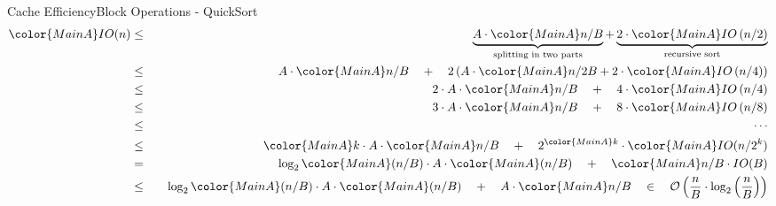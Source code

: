 
\begin{frame}{Cache Efficiency}{Block Operations - QuickSort}
  \begin{eqnarray*}
    {\color{MainA}IO(n)} &\leq\hspace{1em}&
      \underbrace{
        A \cdot {\color{MainA}n/B}
      }_{\text{splitting in two parts}}
      +
      \underbrace{
        2 \cdot {\color{MainA}IO\left(n/2 \right)}
      }_{\text{recursive sort}}\\
    {} &\leq&
      A \cdot {\color{MainA} n/B} \hspace{1em}+ \hspace{1em}2 \left(
        A \cdot {\color{MainA} n/2B}
        + 2 \cdot {\color{MainA}IO\left(n/4\right)}
      \right)\\
    {} &\leq&
      2 \cdot A \cdot {\color{MainA}n/B}
      \hspace{1em}+ \hspace{1em}4 \cdot {\color{MainA}IO\left(n/4\right)}\\
    {} &\leq&
      3 \cdot A \cdot {\color{MainA}n/B}
      \hspace{1em}+ \hspace{1em}8 \cdot {\color{MainA}IO\left(n/8\right)}\\
    {} &\leq&\hspace{1.5em}\cdots\\
    {} &\leq&
      {\color{MainA}k} \cdot A \cdot {\color{MainA}n/B}
      \hspace{1em}+\hspace{1em} 2^{\color{MainA}k}
      \cdot {\color{MainA}IO(n / 2^k)}\\
    {} &=&
      \log_2 {\color{MainA} (n / B)} \cdot A \cdot {\color{MainA}(n / B)}
      \hspace{1em}+\hspace{1em} {\color{MainA} n /B \cdot IO(B)}\\
    {} &\leq&
      \log_2 {\color{MainA} (n /B)} \cdot A \cdot {\color{MainA}(n / B)}
      \hspace{1em}+\hspace{1em} A \cdot {\color{MainA} n/B}
      \hspace{1em} \in \hspace{1em} \mathcal{O}\left(
        \frac{n}{B} \cdot \log_2 \left(\frac{n}{B}\right)
      \right)
  \end{eqnarray*}
\end{frame}
